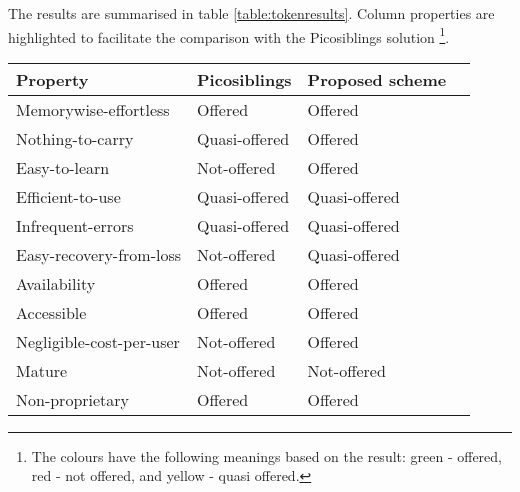 The results are summarised in table \ref{table:tokenresults}. Column properties are highlighted to facilitate the comparison with the Picosiblings solution \footnote{The colours have the following meanings based on the result: green - offered, red - not offered, and yellow - quasi offered.}.

\begin{table}
    \begin{tabular}{l|l|l|l}
    Property                            & Picosiblings  						& Proposed scheme \\ \hline
    Memorywise-effortless               & \cellcolor{green!25}Offered       	& \cellcolor{green!25}Offered          	\\
    Nothing-to-carry                    & \cellcolor{yellow!25}Quasi-offered   	& \cellcolor{green!25}Offered          	\\
    Easy-to-learn                       & \cellcolor{red!25}Not-offered   		& \cellcolor{green!25}Offered          	\\
    Efficient-to-use                    & \cellcolor{yellow!25}Quasi-offered 	& \cellcolor{yellow!25}Quasi-offered   	\\
    Infrequent-errors                   & \cellcolor{yellow!25}Quasi-offered 	& \cellcolor{yellow!25}Quasi-offered   	\\
    Easy-recovery-from-loss             & \cellcolor{red!25}Not-offered   		& \cellcolor{yellow!25}Quasi-offered   	\\
    Availability                        & \cellcolor{green!25}Offered       	& \cellcolor{green!25}Offered      	   	\\ \hline
	
    Accessible                          & \cellcolor{green!25}Offered       	& \cellcolor{green!25}Offered          	\\
    Negligible-cost-per-user            & \cellcolor{red!25}Not-offered   		& \cellcolor{green!25}Offered          	\\
    Mature                              & \cellcolor{red!25}Not-offered   		& \cellcolor{red!25}Not-offered    		\\
    Non-proprietary                     & \cellcolor{green!25}Offered       	& \cellcolor{green!25}Offered      		\\ \hline
	

\end{tabular}
\end{table}
